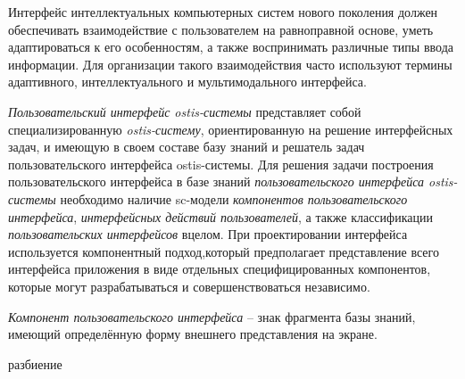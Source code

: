 \bigskip

Интерфейс интеллектуальных компьютерных систем нового поколения должен обеспечивать взаимодействие с пользователем на равноправной основе, уметь адаптироваться к его особенностям, а также воспринимать различные типы ввода информации. Для организации такого взаимодействия часто используют термины адаптивного, интеллектуального и мультимодального интерфейса.

\begin{SCn}
\end{SCn}

\begin{SCn}
\end{SCn}

\begin{SCn}
\end{SCn}

\textit{Пользовательский интерфейс ostis-системы} представляет собой специализированную \textit{ostis-систему}, ориентированную на решение интерфейсных задач, и имеющую в своем составе базу знаний и решатель задач пользовательского интерфейса ostis-системы.
Для решения задачи построения пользовательского интерфейса в базе знаний \textit{пользовательского интерфейса ostis-системы} необходимо наличие sc-модели \textit{компонентов пользовательского интерфейса}, \textit{интерфейсных действий пользователей}, а также классификации \textit{пользовательских интерфейсов} вцелом. При проектировании интерфейса используется компонентный подход,который предполагает представление всего интерфейса приложения в виде отдельных специфицированных компонентов, которые могут разрабатываться и совершенствоваться независимо.

\textit{Компонент пользовательского интерфейса} -- знак фрагмента базы знаний, имеющий определённую форму внешнего представления на экране.

\begin{SCn}

\begin{scnrelfromset}{разбиение}
\end{scnrelfromset}

\end{SCn}

